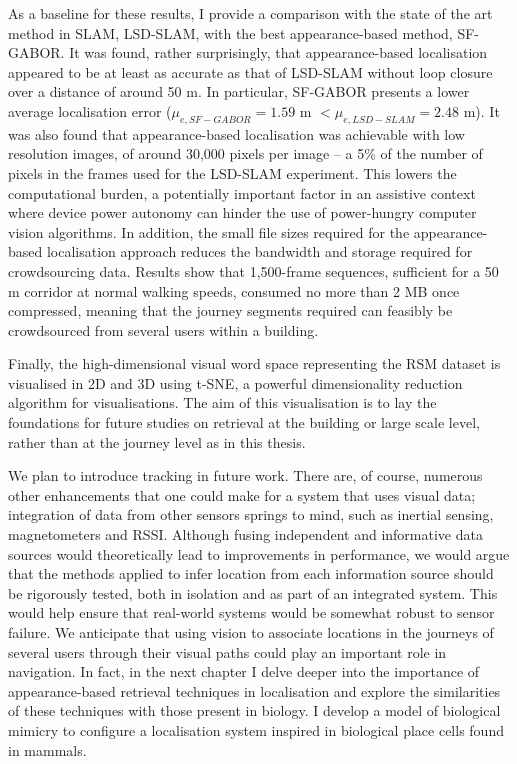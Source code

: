 As a baseline for these results, I provide a comparison with the state of the art method in SLAM, LSD-SLAM, with the best appearance-based method, SF-GABOR. It was found, rather surprisingly, that appearance-based localisation appeared to be at least as accurate as that of LSD-SLAM without loop closure over a distance of around 50 m. In particular, SF-GABOR presents a lower average localisation error ($\mu_{e,SF-GABOR} = 1.59 $ m $< \mu_{e,LSD-SLAM} = 2.48 $ m). It was also found that a\-ppea\-rance\--based localisation was achievable with low resolution images, of around 30,000 pixels per image -- a 5\% of the number of pixels in the frames used for the LSD-SLAM experiment. This lowers the computational burden, a potentially important factor in an assistive context where device power autonomy can hinder the use of power-hungry computer vision algorithms. In addition, the small file sizes required for the appearance-based localisation approach reduces the bandwidth and storage required for crowdsourcing data. Results show that 1,500-frame sequences, sufficient for a 50 m corridor at normal walking speeds, consumed no more than 2 MB once compressed, meaning that the journey segments required can feasibly be crowdsourced from several users within a building.

Finally, the high-dimensional visual word space representing the RSM dataset is visualised in 2D and 3D using t-SNE, a powerful dimensionality reduction algorithm for visualisations. The aim of this visualisation is to lay the foundations for future studies on retrieval at the building or large scale level, rather than at the journey level as in this thesis.

We plan to introduce tracking in future work. There are, of course, numerous other enhancements that one could make for a system that uses visual data; integration of data from other sensors springs to mind, such as inertial sensing, magnetometers and RSSI.  Although fusing independent and informative data sources would theoretically lead to improvements in performance, we would argue that the methods applied to infer location from each information source should be rigorously tested, both in isolation and as part of an integrated system.  This would help ensure that real-world systems would be somewhat robust to sensor failure. We anticipate that using vision to associate locations in the journeys of several users through their visual paths could play an important role in navigation. In fact, in the next chapter I delve deeper into the importance of appearance-based retrieval techniques in localisation and explore the similarities of these techniques with those present in biology. I develop a model of biological mimicry to configure a localisation system inspired in biological place cells found in mammals.


\label{sec:conclusion}


